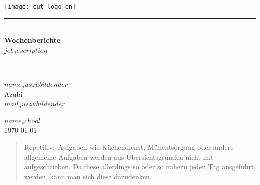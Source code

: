 \documentclass[11pt,a4paper]{article}
\newcommand{\HRule}{\rule{\linewidth}{0.5mm}}
\begin{document}
\begin{titlepage}
\begin{center}
  \texttt{[image: cut-logo-en]}~\\[2cm]


  \HRule \\[0.4cm]
  { \LARGE 
    \textbf{Wochenberichte}\\[0.4cm]
    \emph{$job_description$}\\[0.4cm]
  }
  \HRule \\[1.5cm]



  { \large
    $name_auszubildender$ \\[0.1cm]
    Azubi\\[0.1cm]
    \texttt{$mail_auszubildender$}
  }

  \vfill

  \textsc{\large $name_school$}\\[0.4cm]


  {\large \today}
  
  \end{center}
  \end{titlepage}

  \newpage

  \begin{abstract}
  
    Repetitive Aufgaben wie Küchendienst, Müllentsorgung oder andere allgemeine Aufgaben werden aus Übersichtsgründen nicht mit aufgeschrieben. Da diese allerdings so oder so nahezu jeden Tag ausgeführt werden, kann man sich diese dazudenken.

  \end{abstract}

  \newpage



  \tableofcontents
  \newpage
  \setcounter{page}{1}


  


  \newpage
\end{document}
